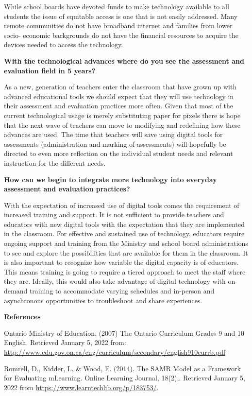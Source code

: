 \documentclass[
]{book}
\begin{document}
While school boards have devoted funds to make technology available to all students the issue of equitable access is one that is not easily addressed. Many remote communities do not have broadband internet and families from lower socio- economic backgrounds do not have the financial resources to acquire the devices needed to access the technology.

\textbf{With the technological advances where do you see the assessment and evaluation field in 5 years?}

As a new, generation of teachers enter the classroom that have grown up with advanced educational tools we should expect that they will use technology in their assessment and evaluation practices more often. Given that most of the current technological usage is merely substituting paper for pixels there is hope that the next wave of teachers can move to modifying and redefining how these advances are used. The time that teachers will save using digital tools for assessments (administration and marking of assessments) will hopefully be directed to even more reflection on the individual student needs and relevant instruction for the different needs.

\textbf{How can we begin to integrate more technology into everyday assessment and evaluation practices?}

With the expectation of increased use of digital tools comes the requirement of increased training and support. It is not sufficient to provide teachers and educators with new digital tools with the expectation that they are implemented in the classroom. For effective and sustained use of technology, educators require ongoing support and training from the Ministry and school board administrations to see and explore the possibilities that are available for them in the classroom. It is also important to recognize how variable the digital capacity is of educators. This means training is going to require a tiered approach to meet the staff where they are. Ideally, this would also take advantage of digital technology with on-demand training to accommodate varying schedules and in-person and asynchronous opportunities to troubleshoot and share experiences.

\textbf{References}

Ontario Ministry of Education. (2007) The Ontario Curriculum Grades 9 and 10 English. Retrieved January 5, 2022 from: \url{http://www.edu.gov.on.ca/eng/curriculum/secondary/english910currb.pdf}

Romrell, D., Kidder, L. \& Wood, E. (2014). The SAMR Model as a Framework for Evaluating mLearning. Online Learning Journal, 18(2),. Retrieved January 5, 2022 from \url{https://www.learntechlib.org/p/183753/}.
\end{document}
